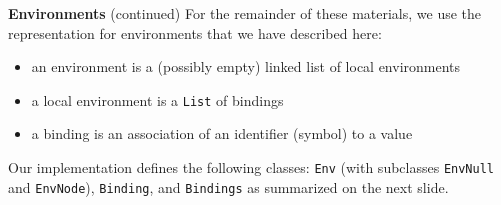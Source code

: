 \begin{minipage}[t]{\sw}
\slidenumber
\LARGE
{\bf Environments} (continued)\exx
For the remainder of these materials,
we use the representation for environments
that we have described here:
\begin{itemize}
\item an environment is a (possibly empty) linked list of local environments
\item a local environment is a \verb'List' of bindings
\item a binding is an association of an identifier (symbol) to a value
\end{itemize}
Our implementation defines the following classes:
\verb'Env' (with subclasses \verb'EnvNull' and \verb'EnvNode'),
\verb'Binding', and \verb'Bindings'
as summarized on the next slide.\exx
\end{minipage}
